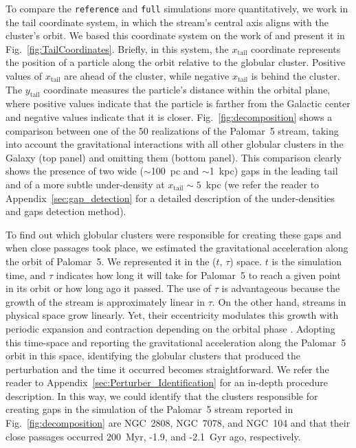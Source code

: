 \documentclass{aa}
\begin{document}
    To compare the \texttt{reference} and \texttt{full} simulations more quantitatively, we work in the tail coordinate system, in which the stream's central axis aligns with the cluster's orbit. We based this coordinate system on the work of \citet{2004AJ....127.2753D} and present it in Fig.~\ref{fig:TailCoordinates}. Briefly, in this system, the $x_{\textrm{tail}}$ coordinate represents the position of a particle along the orbit relative to the globular cluster. Positive values of $x_{\textrm{tail}}$ are ahead of the cluster, while negative $x_{\textrm{tail}}$ is behind the cluster. The $y_{\textrm{tail}}$ coordinate measures the particle's distance within the orbital plane, where positive values indicate that the particle is farther from the Galactic center and negative values indicate that it is closer. Fig.~\ref{fig:decomposition} shows a comparison between one of the 50 realizations of the Palomar~5 stream, taking into account the gravitational interactions with all other globular clusters in the Galaxy (top panel) and omitting them (bottom panel). This comparison clearly shows the presence of two wide ($\sim$100~pc and $\sim$1~kpc) gaps in the leading tail and of a more subtle under-density at $x_{\textrm{tail}}\sim 5$~kpc (we refer the reader to Appendix~\ref{sec:gap_detection} for a detailed description of the under-densities and gaps detection method). 
    
    To find out which globular clusters were responsible for creating these gaps and when close passages took place, we estimated the gravitational acceleration along the orbit of Palomar~5. We represented it in the ($t$, $\tau$) space. $t$ is the simulation time, and $\tau$ indicates how long it will take for Palomar~5 to reach a given point in its orbit or how long ago it passed. The use of $\tau$ is advantageous because the growth of the stream is approximately linear in $\tau$. 
    On the other hand, streams in physical space grow linearly. Yet, their eccentricity modulates this growth with periodic expansion and contraction depending on the orbital phase \citep[see the top panel of Fig.~5.][for an example]{2016MNRAS.457.3817S}. Adopting this time-space and reporting the gravitational acceleration along the Palomar~5 orbit in this space, identifying the globular clusters that produced the perturbation and the time it occurred becomes straightforward. We refer the reader to Appendix~\ref{sec:Perturber_Identification} for an in-depth procedure description. In this way, we could identify that the clusters responsible for creating gaps in the simulation of the Palomar~5 stream reported in Fig.~\ref{fig:decomposition} are NGC~2808, NGC~7078, and NGC~104 and that their close passages occurred 200~Myr, -1.9, and -2.1~Gyr ago, respectively. 
    
\end{document}
